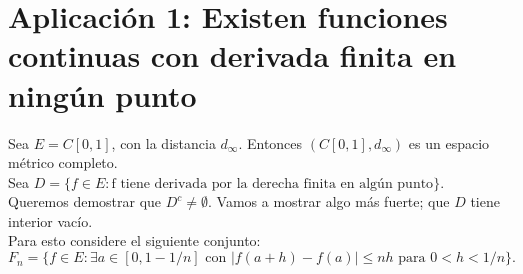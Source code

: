 \documentclass{article}
\theoremstyle{definition}
\begin{document}
\section{Aplicación 1: Existen funciones continuas con derivada finita en ningún punto}\label{ap1}

Sea $E=C[0,1]$, con la distancia $d_\infty$. Entonces $(C[0,1],d_\infty)$ es un espacio métrico completo.\\
Sea $D=\{f\in E: \text{f tiene derivada por la derecha finita en algún punto}\}$.\\
Queremos demostrar que $D^c\neq \emptyset$. Vamos a mostrar algo más fuerte; que $D$ tiene interior vacío.\\
Para esto considere el siguiente conjunto:\\
$$
	F_n=\{f\in E: \exists a\in [0,1-1/n] \text{ con } |f(a+h)-f(a)|\leq nh \text{ para } 0<h<1/n\}.
$$
\end{document}
